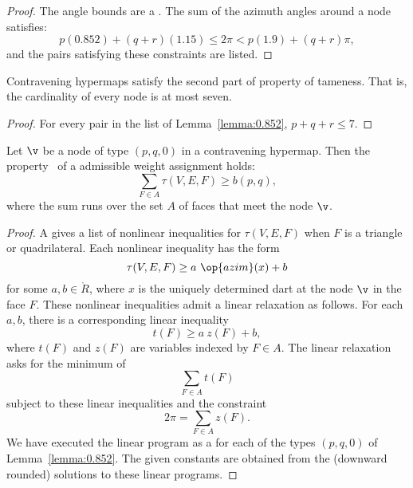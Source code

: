 \begin{proof}
The angle bounds are a .  The sum of the azimuth angles
around a node satisfies:
\[ 
p (0.852) + (q+r) (1.15) \le 2\pi < p (1.9) + (q+r) \pi,
\] 
and the pairs satisfying these constraints are listed.
\end{proof}

\begin{lemma}[]\label{lemma:node-upper}
Contravening hypermaps satisfy the second part of property 
of tameness.  That is, the cardinality of every
node is at most seven.
\end{lemma}

\begin{proof}  For every pair in the list of Lemma~\ref{lemma:0.852},  $p+q+r\le 7$.
\end{proof}




\begin{lemma}[] \label{lemma:weightB}
  Let $\v$ be a node of type $(p,q,0)$ in a contravening hypermap.
  Then the property~ of a admissible weight assignment
  holds:
\[ 
\sum_{ F\in A} \tau(V,E,F) \ge  b(p,q),
\] 
where the sum runs over the set $A$ of faces that meet the node $\v$.
\end{lemma}
%
%

\begin{proof}   A  gives a list of nonlinear
  inequalities for $\tau(V,E,F)$ when $F$ is a triangle or
  quadrilateral. Each nonlinear inequality has the form
\[ \tau(V,E,F) \ge a~\op{azim}(x) + b\] 
for some $a,b\in\ring{R}$, where $x$ is the uniquely determined dart
at the node $\v$ in the face $F$.  These nonlinear inequalities admit
a linear relaxation as follows.  For each $a,b$, there is a corresponding
linear inequality 
%
%
\[ 
t(F) \ge a~z(F) + b,
\] 
where $t(F)$ and $z(F)$ are variables indexed by $F\in A$.
%
%
%
The linear relaxation asks for the minimum of 
\[ \sum_{F\in A} t(F)\] 
subject to these linear inequalities and the constraint
\[ 
2\pi = \sum_{F\in A} z(F).
\] 
We have executed the linear program as a 
for each of the
types $(p,q,0)$ of Lemma~\ref{lemma:0.852}. The given constants are
obtained from the (downward rounded) solutions to these linear
programs.  
\end{proof}

